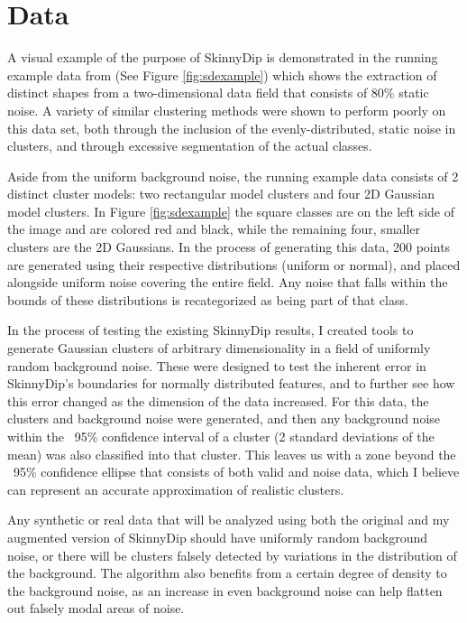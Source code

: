 \documentclass{sig-alternate-05-2015}
\begin{document}
\section{Data} \label{data}
A visual example of the purpose of SkinnyDip is demonstrated in the running example data from \cite{skinnydip} (See Figure \ref{fig:sdexample}) which shows the extraction of distinct shapes from a two-dimensional data field that consists of 80\% static noise. A variety of similar clustering methods were shown to perform poorly on this data set, both through the inclusion of the evenly-distributed, static noise in clusters, and through excessive segmentation of the actual classes.

Aside from the uniform background noise, the running example data consists of 2 distinct cluster models: two rectangular model clusters and four 2D Gaussian model clusters. In Figure \ref{fig:sdexample} the square classes are on the left side of the image and are colored red and black, while the remaining four, smaller clusters are the 2D Gaussians. In the process of generating this data, 200 points are generated using their respective distributions (uniform or normal), and placed alongside uniform noise covering the entire field. Any noise that falls within the bounds of these distributions is recategorized as being part of that class.

In the process of testing the existing SkinnyDip results, I created tools to generate Gaussian clusters of arbitrary dimensionality in a field of uniformly random background noise. These were designed to test the inherent error in SkinnyDip's boundaries for normally distributed features, and to further see how this error changed as the dimension of the data increased. For this data, the clusters and background noise were generated, and then any background noise within the ~95\% confidence interval of a cluster (2 standard deviations of the mean) was also classified into that cluster. This leaves us with a zone beyond the ~95\% confidence ellipse that consists of both valid and noise data, which I believe can represent an accurate approximation of realistic clusters.

Any synthetic or real data that will be analyzed using both the original and my augmented version of SkinnyDip should have uniformly random background noise, or there will be clusters falsely detected by variations in the distribution of the background. The algorithm also benefits from a certain degree of density to the background noise, as an increase in even background noise can help flatten out falsely modal areas of noise.
\end{document}
